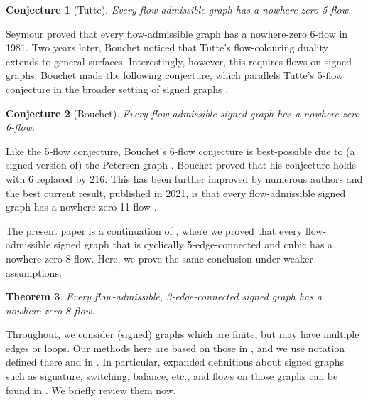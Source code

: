 \documentclass[12pt]{article}
\newtheorem{theorem}{Theorem}[]
\newtheorem{conjecture}[theorem]{Conjecture}
\begin{document}
\begin{conjecture}[Tutte]\label{5fl}
    Every flow-admissible graph has a nowhere-zero 5-flow.
\end{conjecture}

Seymour proved that every flow-admissible graph has a nowhere-zero 6-flow \cite{Seymour6flow} in 1981. Two years later, Bouchet noticed that Tutte's flow-colouring duality extends to general surfaces. Interestingly, however, this requires flows on signed graphs. Bouchet made the following conjecture, which parallels Tutte's 5-flow conjecture in the broader setting of signed graphs \cite{Bouchet}.

\begin{conjecture}[Bouchet]\label{bouchetConj}
    Every flow-admissible signed graph has a nowhere-zero 6-flow.
\end{conjecture}

Like the 5-flow conjecture, Bouchet's 6-flow conjecture is best-possible due to (a signed version of) the Petersen graph \cite{Bouchet}. Bouchet proved that his conjecture holds with 6 replaced by 216. This has been further improved by numerous authors and the best current result, published in 2021, is that every flow-admissible signed graph has a nowhere-zero 11-flow \cite{DLLZZ}.

\medskip

The present paper is a continuation of \cite{devos2023nowherezero}, where we proved that every flow-admissible signed graph that is cyclically 5-edge-connected and cubic has a nowhere-zero $8$-flow. Here, we prove the same conclusion under weaker assumptions.

\begin{theorem}\label{mainthm}
Every flow-admissible, 3-edge-connected signed graph has a nowhere-zero 8-flow.
\end{theorem}

Throughout, we consider (signed) graphs which are finite, but may have multiple edges or loops. Our methods here are based on those in \cite{devos2023nowherezero}, and we use notation defined there and in \cite{Diestel3rdEdition}. In particular, expanded definitions about signed graphs such as signature, switching, balance, etc., and flows on those graphs can be found in \cite{devos2023nowherezero}. We briefly review them now. 
\end{document}
